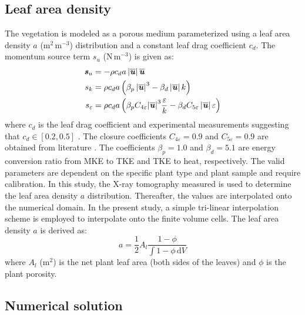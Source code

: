 \subsection{Leaf area density}

The vegetation is modeled as a porous medium parameterized using a leaf area density $a$ (m$^2$\,m$^{-3}$) distribution and a constant leaf drag coefficient $c_d$. The momentum source term $s_u$ (N\,m$^{-3}$) is given as:
	\begin{align}
		\textbf{\textit{s}}_u &=  - \rho {c_d}a\left| \overline{\textbf{\textit{u}}} \right|\overline{\textbf{\textit{u}}} \\
			\label{eq:source_veg1}	
		s_k &= \rho {c_d}a\left( \beta _p \left| \overline{\textbf{\textit{u}}} \right|^3 - \beta _d\left| \overline{\textbf{\textit{u}}} \right|k \right) \\
		s_\varepsilon &= \rho {c_d}a\left( {{\beta _p}{C_{4\varepsilon }}{{\left| \overline{\textbf{\textit{u}}} \right|}^3}\frac{\varepsilon }{k} - {\beta _d}{C_{5\varepsilon }}\left| \overline{\textbf{\textit{u}}} \right|\varepsilon } \right)
		\label{eq:source_veg3}
	\end{align}
where $c_d$ is the leaf drag coefficient \citep{Wilson1977} and experimental measurements suggesting that $c_d \in \left[0.2, 0.5\right]$ \citep{Vogel1989}. The closure coefficients $C_{4\varepsilon}=0.9$ and $C_{5\varepsilon}=0.9$ are obtained from literature \citep{Katul2004, Kenjeres2013, Sanz2003}. The coefficients $\beta_p=1.0$ and $\beta_d=5.1$ are energy conversion ratio from MKE to TKE and TKE to heat, respectively. The valid parameters are dependent on the specific plant type and plant sample and require calibration. In this study, the X-ray tomography measured is used to determine the leaf area density $a$ distribution. Thereafter, the values are interpolated onto the numerical domain. In the present study, a simple tri-linear interpolation scheme is employed to interpolate onto the finite volume cells. The leaf area density $a$ is derived as: 
	\begin{equation}
	a = \frac{1}{2} A_l \frac{1 - \phi}{\int {1 - \phi }\,\mathrm{d}V}
	\label{eq:leafdensitywteq}
	\end{equation}
where $A_l$ (m$^{2}$) is the net plant leaf area (both sides of the leaves) and $\phi$ is the plant porosity. 

\subsection{Numerical solution}

